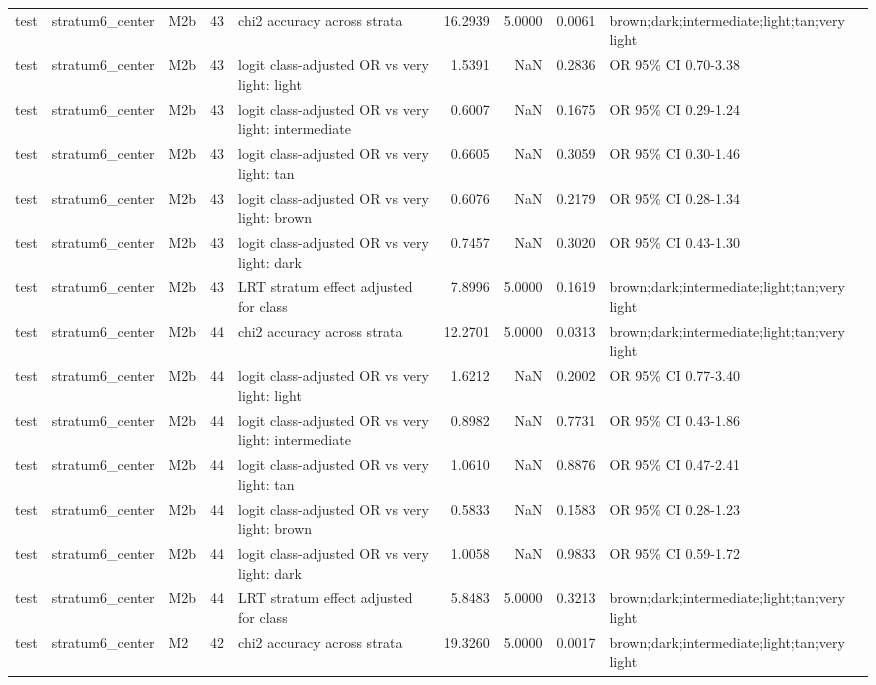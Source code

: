 \begin{tabular}{lllrlrrrl}
test & stratum6\_center & M2b & 43 & chi2 accuracy across strata & 16.2939 & 5.0000 & 0.0061 & brown;dark;intermediate;light;tan;very light \\
test & stratum6\_center & M2b & 43 & logit class-adjusted OR vs very light: light & 1.5391 & NaN & 0.2836 & OR 95\% CI 0.70-3.38 \\
test & stratum6\_center & M2b & 43 & logit class-adjusted OR vs very light: intermediate & 0.6007 & NaN & 0.1675 & OR 95\% CI 0.29-1.24 \\
test & stratum6\_center & M2b & 43 & logit class-adjusted OR vs very light: tan & 0.6605 & NaN & 0.3059 & OR 95\% CI 0.30-1.46 \\
test & stratum6\_center & M2b & 43 & logit class-adjusted OR vs very light: brown & 0.6076 & NaN & 0.2179 & OR 95\% CI 0.28-1.34 \\
test & stratum6\_center & M2b & 43 & logit class-adjusted OR vs very light: dark & 0.7457 & NaN & 0.3020 & OR 95\% CI 0.43-1.30 \\
test & stratum6\_center & M2b & 43 & LRT stratum effect adjusted for class & 7.8996 & 5.0000 & 0.1619 & brown;dark;intermediate;light;tan;very light \\
test & stratum6\_center & M2b & 44 & chi2 accuracy across strata & 12.2701 & 5.0000 & 0.0313 & brown;dark;intermediate;light;tan;very light \\
test & stratum6\_center & M2b & 44 & logit class-adjusted OR vs very light: light & 1.6212 & NaN & 0.2002 & OR 95\% CI 0.77-3.40 \\
test & stratum6\_center & M2b & 44 & logit class-adjusted OR vs very light: intermediate & 0.8982 & NaN & 0.7731 & OR 95\% CI 0.43-1.86 \\
test & stratum6\_center & M2b & 44 & logit class-adjusted OR vs very light: tan & 1.0610 & NaN & 0.8876 & OR 95\% CI 0.47-2.41 \\
test & stratum6\_center & M2b & 44 & logit class-adjusted OR vs very light: brown & 0.5833 & NaN & 0.1583 & OR 95\% CI 0.28-1.23 \\
test & stratum6\_center & M2b & 44 & logit class-adjusted OR vs very light: dark & 1.0058 & NaN & 0.9833 & OR 95\% CI 0.59-1.72 \\
test & stratum6\_center & M2b & 44 & LRT stratum effect adjusted for class & 5.8483 & 5.0000 & 0.3213 & brown;dark;intermediate;light;tan;very light \\
test & stratum6\_center & M2 & 42 & chi2 accuracy across strata & 19.3260 & 5.0000 & 0.0017 & brown;dark;intermediate;light;tan;very light \\

\end{tabular}
